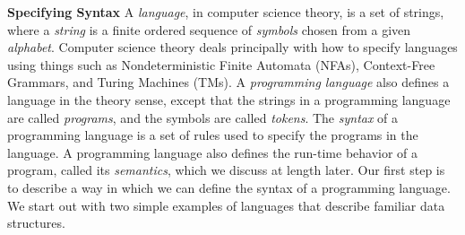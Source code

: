 \begin{minipage}[t]{\sw}
\slidenumber
\LARGE
{\bf Specifying Syntax}\exx
A {\em language},
in computer science theory,
is a set of strings,
where a {\em string} is a finite ordered sequence of {\em symbols}
chosen from a given {\em alphabet}.
Computer science theory
deals principally
with how to specify languages
using things such as Nondeterministic Finite Automata (NFAs),
Context-Free Grammars,
and Turing Machines (TMs).\exx
A {\em programming language}
also defines a language in the theory sense,
except that the strings in a programming language are called {\em programs},
and the symbols are called {\em tokens}.
The {\em syntax} of a programming language is a set
of rules used to specify the programs in the language.
A programming language also defines the run-time behavior
of a program, called its {\em semantics},
which we discuss at length later.\exx
Our first step is to describe a way in which
we can define the syntax of a programming language.
We start out with two simple examples
of languages that describe familiar data structures.
\end{minipage}
\clearpage
